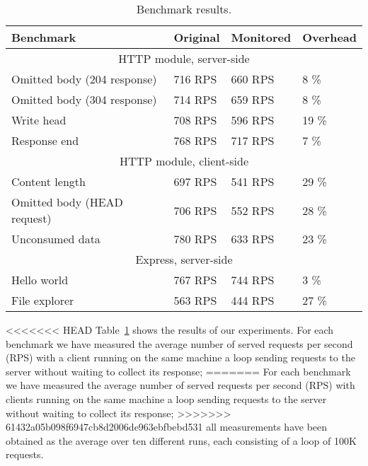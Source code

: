 \begin{table}[ht]
  \begin{tabular}{|l|l|l|l|}
    \hline
    \textbf{Benchmark} &
    \textbf{Original} &
    \textbf{Monitored} &
    \textbf{Overhead} \\
    \hline
    \multicolumn{4}{|c|}{HTTP module, server-side}\\
    \hline

    Omitted body (204 response)&
    716 RPS &
    660 RPS &
    8 \% \\

    Omitted body (304 response)&
    714 RPS &
    659 RPS &
    8 \% \\

    Write head &
    708 RPS &
    596 RPS &
    19 \% \\

    Response end &
    768 RPS &
    717 RPS &
    7 \% \\

    \hline

    \multicolumn{4}{|c|}{HTTP module, client-side}\\
    \hline

    Content length &
    697 RPS &
    541 RPS &
    29 \% \\

    Omitted body (HEAD request)&
    706 RPS &
    552 RPS &
    28 \% \\

    Unconsumed data &
     780 RPS &
     633 RPS &
     23 \% \\

     \hline
    \multicolumn{4}{|c|}{Express, server-side}\\
    \hline
    Hello world &
    767 RPS &
    744 RPS &
    3 \% \\

    File explorer &
    563 RPS &
    444 RPS &
    27 \%\\

    \hline
  \end{tabular}
  \caption{Benchmark results.}
  \label{table}
\end{table}
<<<<<<< HEAD
\vspace{-1em}
Table~\ref{table} shows the results of our experiments.
For each benchmark we have measured the average number of served requests per second (RPS)
with a client running on the same machine a loop sending requests to the server without waiting to collect its response;
=======
For each benchmark we have measured the average number of served requests per second (RPS)
with clients running on the same machine a loop sending requests to the server without waiting to collect its response;
>>>>>>> 61432a05b098f6947cb8d2006de963ebfbebd531
all measurements have been obtained as the average over ten different runs, each consisting
of a loop of 100K requests.

